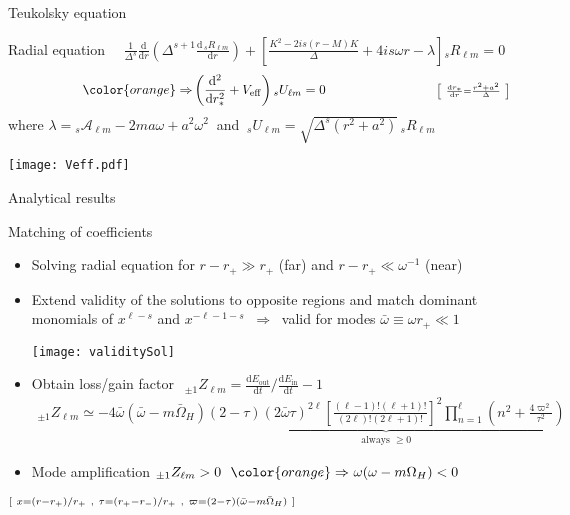 \documentclass[9pt]{beamer}
\newcommand{\dd}{\mathrm{d}}
\newcommand{\uu}[3][]{ {}_{#1} #2_{#3} }
\begin{document}
\begin{frame}{Teukolsky equation}
	
	\begin{block}{Radial equation $\quad \frac{1}{\Delta^s} \frac{\dd}{\dd r} \left( \Delta^{s+1} \frac{\dd\, {}_{s}R_{\ell m}}{\dd r} \right)
+ \left[ \frac{K^2 - 2 i s (r-M)K}{\Delta} + 4 i s \omega r -\lambda \right] {}_{s}R_{\ell m} = 0$}
		$$ \hspace*{2cm} {\color{orange}\Rightarrow} \left( \frac{\dd^2}{\dd r_{*}^2} + V_\mathrm{eff} \right) {}_{s}U_{\ell m} = 0 \hspace*{3cm} {\scriptstyle \left[~\frac{\dd r_*}{\dd r} = \frac{r^2+a^2}{\Delta}~\right] } $$
		where $\lambda = {}_{s}\mathscr{A}_{\ell m} - 2 m a \omega + a^2 \omega^2~$ and $~{}_{s}U_{\ell m}=\sqrt{\Delta^s (r^2 + a^2)} \,{}_{s}R_{\ell m}~$
		
		\texttt{[image: Veff.pdf]}
	\end{block}
	
\end{frame}


\begin{frame}{Analytical results}
	
	\begin{block}{Matching of coefficients}
		\begin{itemize}
			\setlength\itemsep{0.6em}
			\item Solving radial equation for $r - r_+ \gg r_+$ (far) and $r - r_+ \ll \omega^{-1}$ (near)
			
			\item Extend validity of the solutions to opposite regions and match dominant monomials of $x^{\ell-s}$ and $x^{-\ell-1-s}$ $~\Rightarrow~$ valid for modes $\bar{\omega}\equiv \omega r_+ \ll 1$
			\begin{center}
				\texttt{[image: validitySol]}
			\end{center}	
		
			\item Obtain loss/gain factor $~\boxed{\displaystyle ~{}_{\pm 1}Z_{\ell m} = \frac{\dd E_\mathrm{out}}{\dd t}\bigg/\frac{\dd E_\mathrm{in}}{\dd t} - 1~}$
			\begin{align*}
				\uu[\pm1]{Z}{\ell m} \simeq  - 4 \bar{\omega} (\bar{\omega} - m \bar{\Omega}_H) \underbrace{(2-\tau)(2\bar{\omega} \tau)^{2\ell} \left[\frac{(\ell-1)! (\ell+1)!}{(2\ell)! (2\ell+1)!}\right]^2 \prod_{n=1}^{\ell} \left(n^2 + \frac{4 \varpi^2}{\tau^2} \right)}_\text{always $\ge 0$}
			\end{align*}
			
			\item Mode amplification $\uu[\pm1]{Z}{\ell m}>0 ~~{\color{orange}\Rightarrow}~ \omega (\omega - m \Omega_H) < 0$  
		\end{itemize}
		$\scriptstyle \hfill [~ x = (r-r_{+})/r_{+} ~,~ \tau = (r_{+}-r_{-})/r_{+} ~,~ \varpi = (2-\tau)(\bar{\omega} - m \bar{\Omega}_H) ~]$
	\end{block}
	
\end{frame}
\end{document}
